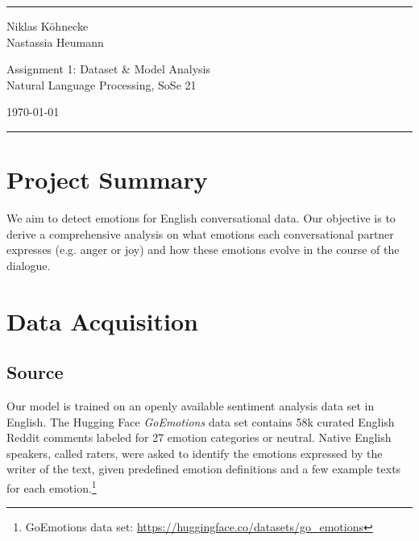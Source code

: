 \documentclass[a4paper]{article}
\begin{document}

\fancyhead[C]{}
\hrule \medskip %
\begin{minipage}{0.25\textwidth} 
\raggedright
\footnotesize
Niklas Köhnecke\hfill\\   
Nastassia Heumann\hfill\\
\end{minipage}
\begin{minipage}{0.5\textwidth} 
\centering 
\large 
Assignment 1: Dataset \& Model Analysis\\ 
\normalsize 
Natural Language Processing, SoSe 21\\ 
\end{minipage}
\begin{minipage}{0.25\textwidth} 
\raggedleft
\today\hfill\\
\end{minipage}
\medskip\hrule 
\bigskip


\section{Project Summary}

We aim to detect emotions for English conversational data. Our objective is to derive a comprehensive analysis on what emotions each conversational partner expresses (e.g. anger or joy) and how these emotions evolve in the course of the dialogue.


\section{Data Acquisition}

\subsection{Source}

Our model is trained on an openly available sentiment analysis data set in English. The Hugging Face \textit{GoEmotions} data set contains 58k curated English Reddit comments labeled for 27 emotion categories or neutral. Native English speakers, called raters, were asked to identify the emotions expressed by the writer of the text, given predefined emotion definitions and a few example texts for each emotion.\footnote{GoEmotions data set: \url{https://huggingface.co/datasets/go_emotions}} 
\end{document}
